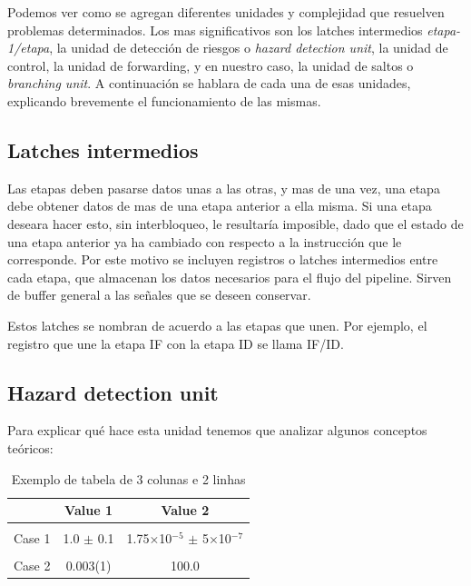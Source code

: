 \documentclass[12pt]{article}
\begin{document}
Podemos ver como se agregan diferentes unidades y complejidad que resuelven problemas determinados. Los mas significativos son los latches intermedios \textit{etapa-1/etapa}, la unidad de detección de riesgos o \textit{hazard detection unit}, la unidad de control, la unidad de forwarding, y en nuestro caso, la unidad de saltos o \textit{branching unit}. A continuación se hablara de cada una de esas unidades, explicando brevemente el funcionamiento de las mismas.

\subsection{Latches intermedios}

Las etapas deben pasarse datos unas a las otras, y mas de una vez, una etapa debe obtener datos de mas de una etapa anterior a ella misma. Si una etapa deseara hacer esto, sin interbloqueo, le resultaría imposible, dado que el estado de una etapa anterior ya ha cambiado con respecto a la instrucción que le corresponde. Por este motivo se incluyen registros o latches intermedios entre cada etapa, que almacenan los datos necesarios para el flujo del pipeline. Sirven de buffer general a las señales que se deseen conservar.

Estos latches se nombran de acuerdo a las etapas que unen. Por ejemplo, el registro que une la etapa IF con la etapa ID se llama IF/ID.

\subsection{Hazard detection unit}

Para explicar qué hace esta unidad tenemos que analizar algunos conceptos teóricos:





\begin{table}[!ht]
\centering
\caption{Exemplo de tabela de 3 colunas e 2 linhas}
\label{tab:exTable1}
\smallskip
\begin{tabular}{l c c}
\hline
& Value 1 & Value 2\\[0.5ex]
\hline
&&\\[-2ex]
Case 1 & 1.0 $\pm$ 0.1 & 1.75$\times$10$^{-5}$ $\pm$ 5$\times$10$^{-7}$\\[0.5ex]
\hline
&&\\[-2ex]
Case 2 & 0.003(1) & 100.0\\[0.5ex]
\hline
\end{tabular}
\end{table}
\end{document}
